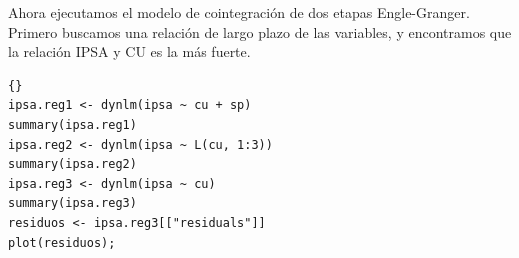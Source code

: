 %	
	Ahora ejecutamos el modelo de cointegraci\'on de dos etapas Engle-Granger. Primero buscamos una relaci\'on de largo plazo de las variables, y encontramos que la relaci\'on IPSA y CU es la m\'as fuerte. \\
%			
%	
\begin{lstlisting}[title={‘Código R: },basicstyle=\ttfamily]{}
ipsa.reg1 <- dynlm(ipsa ~ cu + sp)
summary(ipsa.reg1)
ipsa.reg2 <- dynlm(ipsa ~ L(cu, 1:3)) 
summary(ipsa.reg2)
ipsa.reg3 <- dynlm(ipsa ~ cu)
summary(ipsa.reg3)
residuos <- ipsa.reg3[["residuals"]] 
plot(residuos);
\end{lstlisting}
%	
